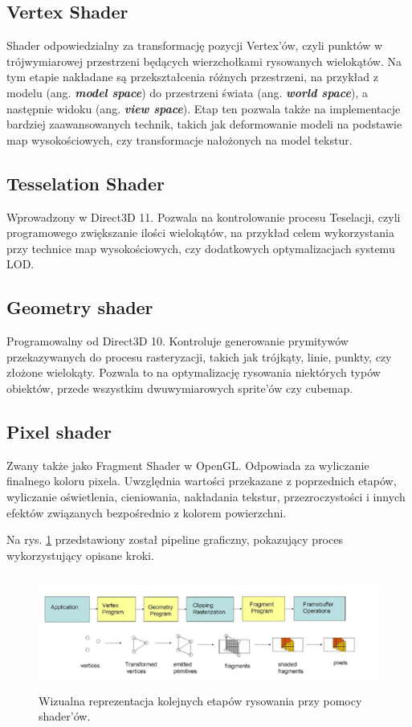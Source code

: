 \subsection{Vertex Shader}
Shader odpowiedzialny za transformację pozycji Vertex'ów, czyli punktów
w trójwymiarowej przestrzeni będących wierzchołkami rysowanych
wielokątów. Na tym etapie nakładane są przekształcenia różnych
przestrzeni, na przykład z modelu (ang. \emph{\textbf{model space}}) do przestrzeni świata (ang. \emph{\textbf{world space}}), a
następnie widoku (ang. \emph{\textbf{view space}}). Etap ten pozwala także na implementacje bardziej zaawansowanych technik,
takich jak deformowanie modeli na podstawie map wysokościowych, czy transformacje nałożonych na model tekstur.

\subsection{Tesselation Shader}
Wprowadzony w Direct3D 11. Pozwala na kontrolowanie procesu Teselacji,
czyli programowego zwiększanie ilości wielokątów, na przykład celem
wykorzystania przy technice map wysokościowych, czy dodatkowych
optymalizacjach systemu LOD.

\subsection{Geometry shader}
Programowalny od Direct3D 10. Kontroluje generowanie prymitywów
przekazywanych do procesu rasteryzacji, takich jak trójkąty, linie,
punkty, czy złożone wielokąty. Pozwala to na optymalizację rysowania
niektórych typów obiektów, przede wszystkim dwuwymiarowych sprite'ów czy
cubemap.

\subsection{Pixel shader}
Zwany także jako Fragment Shader w OpenGL. Odpowiada za wyliczanie
finalnego koloru pixela. Uwzględnia wartości przekazane z
poprzednich etapów, wyliczanie oświetlenia, cieniowania, nakładania
tekstur, przezroczystości i innych efektów związanych bezpośrednio z
kolorem powierzchni.

Na rys. \ref{fig:shader_pipeline} przedstawiony został pipeline graficzny, pokazujący proces wykorzystujący opisane kroki.

\begin{figure}[htbp] 
	\centering
	\includegraphics[width=5.34091in,height=1.48711in]{images/19_shader_pipeline.png}
	\caption{Wizualna reprezentacja kolejnych etapów rysowania przy pomocy shader'ów. \cite{researchgate:openglpipeline:2024}}
	\label{fig:shader_pipeline} 
\end{figure}

